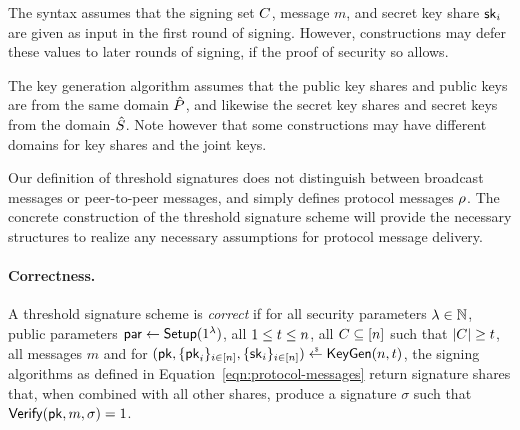 \begin{remark} \label{rem:defer}
The syntax assumes that the signing set $C$, message $m$, and secret key share $\mathsf{sk}_i$ are given as input in the first round of signing.
  However, constructions may defer these values to later rounds of signing,
  if the proof of security so allows.
\end{remark}

\begin{remark}
  The key generation algorithm assumes that the public key shares and public keys are from the same domain $\hat{P}$,
  and likewise the secret key shares and secret keys from the domain $\hat{S}$.
  Note however that some constructions may have different domains for key shares and the joint keys.
\end{remark}


\begin{remark}
  Our definition of threshold signatures does not distinguish between broadcast messages or peer-to-peer messages,
  and simply defines protocol messages $\rho$.
  The concrete construction of the threshold signature scheme will provide the necessary structures to realize any necessary assumptions for protocol message delivery.
\end{remark}

\paragraph{Correctness.}
A threshold signature scheme is \emph{correct} if for all security parameters $\lambda \in \mathbb{N}$,
public parameters $\mathsf{par} \gets \mathsf{Setup}(1^\lambda)$,
all $1 \leq t \leq n$,
all $C \subseteq [n]$ such that $| C | \geq t$,
all messages $m$ and
for $(\aggpk, \{ \aggpk_i \}_{i \in \set{n}}, \{ \sk_i \}_{i \in \set{n}}) \allowbreak \randpick \KeyGen(n, \allowbreak \thresh)$,
the signing algorithms as defined in Equation~\ref{eqn:protocol-messages} return signature shares that,
when combined with all other shares,
produce a signature $\sigma$ such that $\mathsf{Verify}(\mathsf{pk}, m, \sigma) = 1$.

